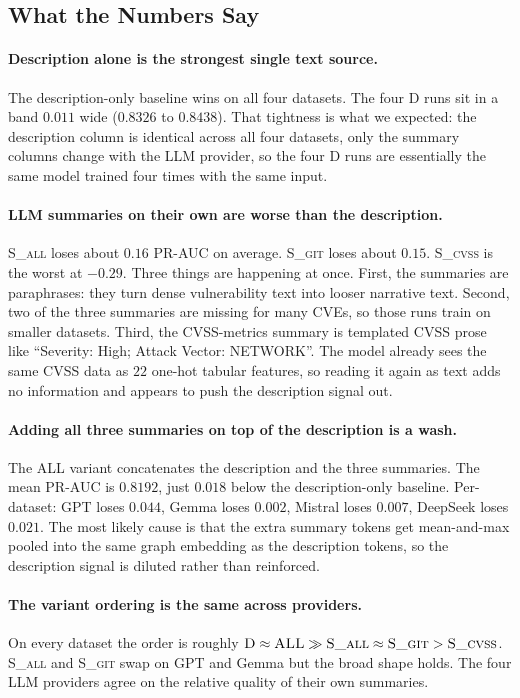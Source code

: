 \documentclass[11pt]{article}
\begin{document}
\subsection{What the Numbers Say}

\paragraph{Description alone is the strongest single text source.}
The description-only baseline wins on all four datasets. The four
\textsc{D} runs sit in a band $0.011$ wide ($0.8326$ to $0.8438$).
That tightness is what we expected: the description column is
identical across all four datasets, only the summary columns change
with the LLM provider, so the four \textsc{D} runs are essentially
the same model trained four times with the same input.

\paragraph{LLM summaries on their own are worse than the description.}
\textsc{S\_all} loses about $0.16$ PR-AUC on average. \textsc{S\_git}
loses about $0.15$. \textsc{S\_cvss} is the worst at $-0.29$. Three
things are happening at once. First, the summaries are paraphrases:
they turn dense vulnerability text into looser narrative text. Second,
two of the three summaries are missing for many CVEs, so those runs
train on smaller datasets. Third, the CVSS-metrics summary is
templated CVSS prose like ``Severity: High; Attack Vector: NETWORK''.
The model already sees the same CVSS data as $22$ one-hot tabular
features, so reading it again as text adds no information and
appears to push the description signal out.

\paragraph{Adding all three summaries on top of the description is a wash.}
The \textsc{ALL} variant concatenates the description and the three
summaries. The mean PR-AUC is $0.8192$, just $0.018$ below the
description-only baseline. Per-dataset: GPT loses $0.044$, Gemma
loses $0.002$, Mistral loses $0.007$, DeepSeek loses $0.021$. The
most likely cause is that the extra summary tokens get mean-and-max
pooled into the same graph embedding as the description tokens, so
the description signal is diluted rather than reinforced.

\paragraph{The variant ordering is the same across providers.}
On every dataset the order is roughly
$\textsc{D} \approx \textsc{ALL} \gg \textsc{S\_all} \approx \textsc{S\_git} > \textsc{S\_cvss}$.
\textsc{S\_all} and \textsc{S\_git} swap on GPT and Gemma but the
broad shape holds. The four LLM providers agree on the relative
quality of their own summaries.
\end{document}
